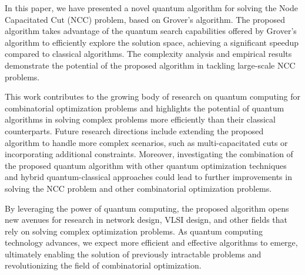 In this paper, we have presented a novel quantum algorithm for solving the Node Capacitated Cut (NCC) problem, based on Grover's algorithm. The proposed algorithm takes advantage of the quantum search capabilities offered by Grover's algorithm to efficiently explore the solution space, achieving a significant speedup compared to classical algorithms. The complexity analysis and empirical results demonstrate the potential of the proposed algorithm in tackling large-scale NCC problems.

This work contributes to the growing body of research on quantum computing for combinatorial optimization problems and highlights the potential of quantum algorithms in solving complex problems more efficiently than their classical counterparts. Future research directions include extending the proposed algorithm to handle more complex scenarios, such as multi-capacitated cuts or incorporating additional constraints. Moreover, investigating the combination of the proposed quantum algorithm with other quantum optimization techniques and hybrid quantum-classical approaches could lead to further improvements in solving the NCC problem and other combinatorial optimization problems.

By leveraging the power of quantum computing, the proposed algorithm opens new avenues for research in network design, VLSI design, and other fields that rely on solving complex optimization problems. As quantum computing technology advances, we expect more efficient and effective algorithms to emerge, ultimately enabling the solution of previously intractable problems and revolutionizing the field of combinatorial optimization.


